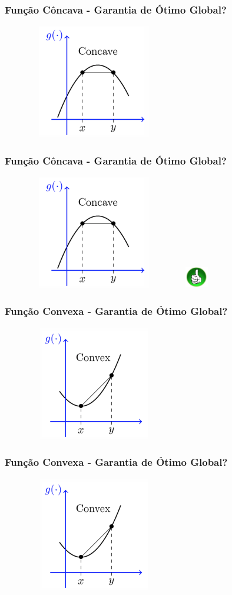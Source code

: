 \documentclass{beamer}
\begin{document}
\begin{frame}
	\centering
	{
		\frametitle{Função Côncava - Garantia de Ótimo Global?}
		\includegraphics[width=8cm,height=5cm]{concava.png}	
	}
	{
		\frametitle{Função Côncava - Garantia de Ótimo Global?}
		\includegraphics[width=8cm,height=5cm]{concava.png}	
		\includegraphics[width=1cm,height=1cm]{sim.png}
	}
	{
		\frametitle{Função Convexa - Garantia de Ótimo Global?}
		\includegraphics[width=8cm,height=5cm]{convexa.png}	
	}
	{
		\frametitle{Função Convexa - Garantia de Ótimo Global?}
		\includegraphics[width=8cm,height=5cm]{convexa.png}	
}
\end{frame}
\end{document}
